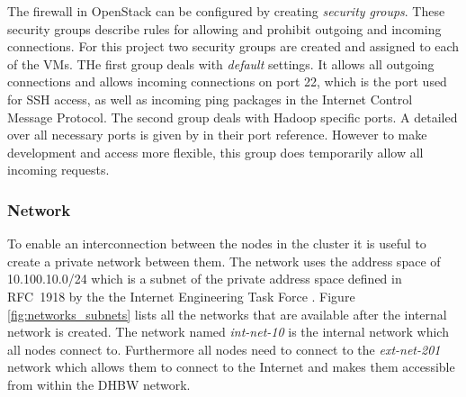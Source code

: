 The firewall in OpenStack can be configured by creating \emph{security groups}.
These security groups describe rules for allowing and prohibit outgoing and incoming connections.
For this project two security groups are created and assigned to each of the \acp{VM}.
THe first group deals with \emph{default} settings. It allows all outgoing connections 
and allows incoming connections on port 22, which is the port used for \ac{SSH} access, 
as well as incoming ping packages in the Internet Control Message Protocol.
The second group deals with Hadoop specific ports.
A detailed over all necessary ports is given by \textcite{hortonworks2017reference} in their port reference.
However to make development and access more flexible, this group does temporarily 
allow all incoming requests.

\subsubsection{Network}

To enable an interconnection between the nodes in the cluster it is useful to create a private network between them.
The network uses the address space of 10.100.10.0/24 which is a subnet of the private address space defined in RFC~1918 by the the Internet Engineering Task Force \autocite[][]{ietf1996rfc1918}.
Figure \ref{fig:networks_subnets} lists all the networks that are available after the internal network is created. 
The network named \emph{int-net-10} is the internal network which all nodes connect to. Furthermore all nodes need to connect to the \emph{ext-net-201} network which allows them to connect to the Internet and makes them accessible from within the \ac{DHBW} network.


